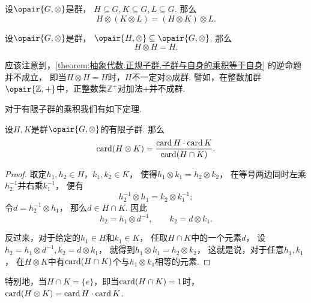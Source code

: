 \begin{theorem}
设\(\opair{G,\otimes}\)是群，
\(H \subseteq G,
K \subseteq G,
L \subseteq G\).
那么\[
	H \otimes (K \otimes L)
	= (H \otimes K) \otimes L.
\]
\end{theorem}

\begin{theorem}\label{theorem:抽象代数.正规子群.子群与自身的乘积等于自身}
设\(\opair{G,\otimes}\)是群，
\(\opair{H,\otimes} \subseteq \opair{G,\otimes}\).
那么\[
	H \otimes H = H.
\]
\end{theorem}

应该注意到，\cref{theorem:抽象代数.正规子群.子群与自身的乘积等于自身} 的逆命题并不成立，
即当\(H \otimes H = H\)时，\(H\)不一定对\(\otimes\)成群.
譬如，在整数加群\(\opair{\mathbb{Z},+}\)中，正整数集\(\mathbb{Z}^+\)对加法\(+\)并不成群.

对于有限子群的乘积我们有如下定理.
\begin{theorem}
设\(H,K\)是群\(\opair{G,\otimes}\)的有限子群.
那么\[
	\operatorname{card}(H \otimes K)
	= \frac{\operatorname{card} H \cdot \operatorname{card} K}{\operatorname{card}(H \cap K)}.
\]
\begin{proof}
取定\(h_1,h_2 \in H\)，\(k_1,k_2 \in K\)，
使得\(h_1 \otimes k_1 = h_2 \otimes k_2\)，
在等号两边同时左乘\(h_2^{-1}\)并右乘\(k_1^{-1}\)，
便有\[
	h_2^{-1} \otimes h_1 = k_2 \otimes k_1^{-1};
\]
令\(d = h_2^{-1} \otimes h_1\)，
那么\(d \in H \cap K\).
因此\[
	h_2 = h_1 \otimes d^{-1}, \qquad
	k_2 = d \otimes k_1.
\]

反过来，对于给定的\(h_1 \in H\)和\(k_1 \in K\)，
任取\(H \cap K\)中的一个元素\(d\)，
设\(h_2 = h_1 \otimes d^{-1},
k_2 = d \otimes k_1\)，
就得到\(h_1 \otimes k_1 = h_2 \otimes k_2\)，
这就是说，对于任意\(h_1,k_1\)，
在\(H \otimes K\)中有\(\operatorname{card}(H \cap K)\)个与\(h_1 \otimes k_1\)相等的元素.
\end{proof}
\end{theorem}

特别地，当\(H \cap K = \{e\}\)，即当\(\operatorname{card}(H \cap K) = 1\)时，
\(\operatorname{card}(H \otimes K) = \operatorname{card} H \cdot \operatorname{card} K\).
